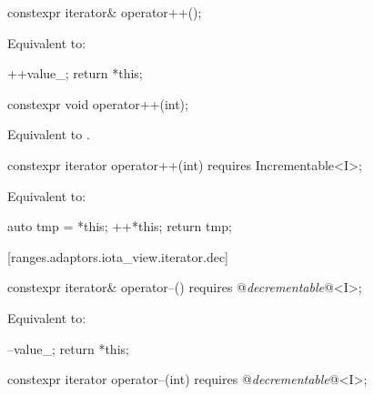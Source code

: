 \begin{itemdecl}
constexpr iterator& operator++();
\end{itemdecl}

\begin{itemdescr}
\pnum
\effects Equivalent to:
\begin{codeblock}
++value_;
return *this;
\end{codeblock}
\end{itemdescr}

\begin{itemdecl}
constexpr void operator++(int);
\end{itemdecl}

\begin{itemdescr}
\pnum
\effects Equivalent to .
\end{itemdescr}

\begin{itemdecl}
constexpr iterator operator++(int) requires Incrementable<I>;
\end{itemdecl}

\begin{itemdescr}
\pnum
\effects Equivalent to:
\begin{codeblock}
auto tmp = *this;
++*this;
return tmp;
\end{codeblock}
\end{itemdescr}

[ranges.adaptors.iota_view.iterator.dec]{}

\begin{itemdecl}
constexpr iterator& operator--() requires @\textit{decrementable}@<I>;
\end{itemdecl}

\begin{itemdescr}
\pnum
\effects Equivalent to:
\begin{codeblock}
--value_;
return *this;
\end{codeblock}
\end{itemdescr}

\begin{itemdecl}
constexpr iterator operator--(int) requires @\textit{decrementable}@<I>;
\end{itemdecl}

